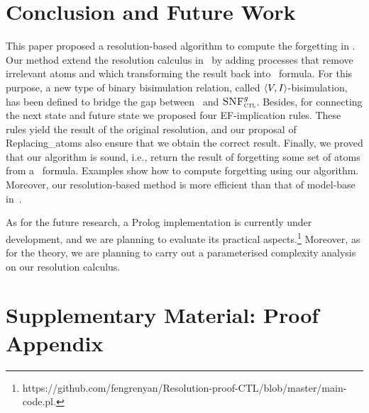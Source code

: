 \documentclass[letterpaper]{article}
\begin{document}
\section{Conclusion and Future Work}
This paper proposed a resolution-based algorithm to compute the forgetting in \CTL.
Our method extend the resolution calculus in~\cite{zhang2014resolution} by adding processes that remove  irrelevant atoms and which transforming the result back into \CTL\ formula.
For this purpose, a new type of binary bisimulation relation, called ${\langle{V,I}\rangle}$-bisimulation, has been defined to bridge the gap between \CTL\ and ${\textsc{SNF}_{\textsc{ctl}}^g}$. Besides, for connecting the next state and future state we proposed four EF-implication rules. These rules yield the result of the original resolution, and our proposal of Replacing\_atoms also ensure that we obtain the correct result.
Finally, we proved that our algorithm is sound, i.e., return the result of forgetting some set of atoms from a \CTL\ formula.
Examples show how to compute forgetting using our algorithm.
Moreover, our resolution-based method is more efficient than that of model-base in~\cite{renyansfirstpaper}.

As for the future research, a Prolog implementation is currently under development, and we are planning to evaluate its practical aspects.\footnote{https://github.com/fengrenyan/Resolution-proof-CTL/blob/master/main-code.pl.} 
Moreover, as for the theory, we are planning to carry out a parameterised complexity analysis on our resolution calculus.



\clearpage





\clearpage
\appendix
\section{Supplementary Material: Proof Appendix}

\end{document}
